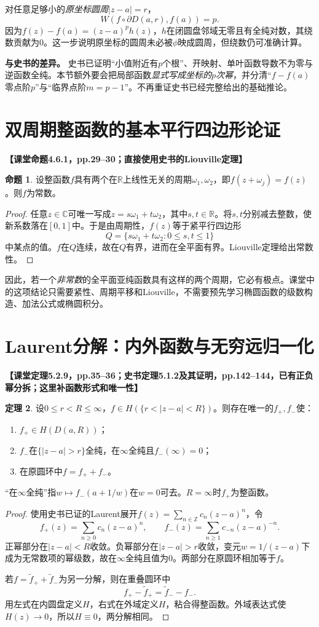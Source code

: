 \documentclass[11pt,a4paper,fontset=fandol]{ctexart}
\theoremstyle{definition}\newtheorem{theorem}{定理}[section]\newtheorem{proposition}[theorem]{命题}\newtheorem{definition}[theorem]{定义}
\newcommand{\C}{\mathbb C}\newcommand{\R}{\mathbb R}\newcommand{\Z}{\mathbb Z}\newcommand{\D}{\mathbb D}\newcommand{\dd}{\,\mathrm d}
\newcommand{\src}[1]{\par\noindent\textbf{【#1】}\par\nopagebreak}
\begin{document}
对任意足够小的\emph{原坐标圆周}$|z-a|=r$，
\[W(f\circ\partial D(a,r),f(a))=p.\]
因为$f(z)-f(a)=(z-a)^ph(z)$，$h$在闭圆盘邻域无零且有全纯对数，其绕数贡献为0。这一步说明原坐标的圆周未必被$\phi$映成圆周，但绕数仍可准确计算。

\textbf{与史书的差异。} 史书已证明“小值附近有$p$个根”、开映射、单叶函数导数不为零与逆函数全纯。本节额外要会把局部函数\emph{显式写成坐标的$p$次幂}，并分清“$f-f(a)$零点阶$p$”与“临界点阶$m=p-1$”。不再重证史书已经完整给出的基础推论。

\section{双周期整函数的基本平行四边形论证}
\src{课堂命题4.6.1，pp.29--30；直接使用史书的Liouville定理}
\begin{proposition}
设整函数$f$具有两个在$\R$上线性无关的周期$\omega_1,\omega_2$，即$f(z+\omega_j)=f(z)$。则$f$为常数。
\end{proposition}
\begin{proof}
任意$z\in\C$可唯一写成$z=s\omega_1+t\omega_2$，其中$s,t\in\R$。将$s,t$分别减去整数，使新系数落在$[0,1]$中。于是由周期性，$f(z)$等于紧平行四边形
\[Q=\{s\omega_1+t\omega_2:0\le s,t\le1\}\]
中某点的值。$f$在$Q$连续，故在$Q$有界，进而在全平面有界。Liouville定理给出常数性。
\end{proof}

因此，若一个\emph{非常数}的全平面亚纯函数具有这样的两个周期，它必有极点。课堂中的这项结论只需要紧性、周期平移和Liouville，不需要预先学习椭圆函数的级数构造、加法公式或椭圆积分。

\section{Laurent分解：内外函数与无穷远归一化}
\src{课堂定理5.2.9，pp.35--36；史书定理5.1.2及其证明，pp.142--144，已有正负幂分拆；这里补函数形式和唯一性}
\begin{theorem}
设$0\le r<R\le\infty$，$f\in H(\{r<|z-a|<R\})$。则存在唯一的$f_+,f_-$使：
\begin{enumerate}[label=(\arabic*)]
\item $f_+\in H(D(a,R))$；
\item $f_-$在$\{|z-a|>r\}$全纯，在$\infty$全纯且$f_-(\infty)=0$；
\item 在原圆环中$f=f_++f_-$。
\end{enumerate}
“在$\infty$全纯”指$w\mapsto f_-(a+1/w)$在$w=0$可去。$R=\infty$时$f_+$为整函数。
\end{theorem}
\begin{proof}
使用史书已证的Laurent展开$f(z)=\sum_{n\in\Z}c_n(z-a)^n$，令
\[f_+(z)=\sum_{n\ge0}c_n(z-a)^n,\qquad f_-(z)=\sum_{n\ge1}c_{-n}(z-a)^{-n}.\]
正幂部分在$|z-a|<R$收敛。负幂部分在$|z-a|>r$收敛，变元$w=1/(z-a)$下成为无常数项的幂级数，故在$\infty$全纯且值为0。两部分在原圆环相加等于$f$。

若$f=\widetilde f_++\widetilde f_-$为另一分解，则在重叠圆环中
\[f_+-\widetilde f_+=\widetilde f_--f_-.\]
用左式在内圆盘定义$H$，右式在外域定义$H$，粘合得整函数。外域表达式使$H(z)\to0$，所以$H\equiv0$，两分解相同。
\end{proof}
\end{document}
